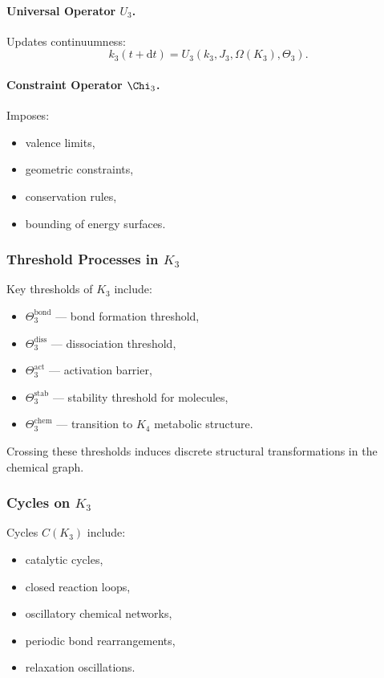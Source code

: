 \paragraph{Universal Operator \texorpdfstring{$U_3$}{U_3}.}
Updates continuumness:
\[
k_3(t+\mathrm{d}t) = U_3(k_3, J_3, \Omega(K_3), \Theta_3).
\]

\paragraph{Constraint Operator \texorpdfstring{$\Chi_3$}{\Chi_3}.}
Imposes:
\begin{itemize}
    \item valence limits,
    \item geometric constraints,
    \item conservation rules,
    \item bounding of energy surfaces.
\end{itemize}

\subsubsection{Threshold Processes in \texorpdfstring{$K_3$}{K_3}}

Key thresholds of $K_3$ include:

\begin{itemize}
    \item $\Theta_3^{\text{bond}}$ — bond formation threshold,
    \item $\Theta_3^{\text{diss}}$ — dissociation threshold,
    \item $\Theta_3^{\text{act}}$ — activation barrier,
    \item $\Theta_3^{\text{stab}}$ — stability threshold for molecules,
    \item $\Theta_3^{\text{chem}}$ — transition to $K_4$ metabolic structure.
\end{itemize}

Crossing these thresholds induces discrete structural transformations in 
the chemical graph.

\subsubsection{Cycles on \texorpdfstring{$K_3$}{K_3}}

Cycles $C(K_3)$ include:
\begin{itemize}
    \item catalytic cycles,
    \item closed reaction loops,
    \item oscillatory chemical networks,
    \item periodic bond rearrangements,
    \item relaxation oscillations.
\end{itemize}

